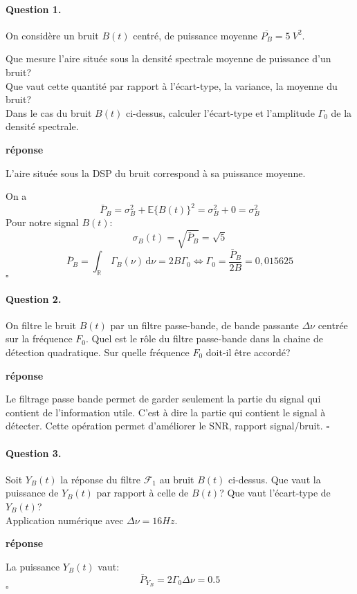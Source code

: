 \documentclass{article}
\newcommand{\dnu}{16}
\newcommand{\debutrep}[1]{\color{blue}\begin{center} \hrulefill \textbf{ #1 } \hrulefill \end{center} }
\newcommand{\finrep}{\vspace*{5mm}\hfill $\square$\color{black}\vspace*{5mm}}
\begin{document}
\paragraph{Question 1.}
On considère un bruit $B(t)$ centré, de puissance moyenne $\overline{P_B} = 5~V^2$.

Que mesure l'aire située sous la densité spectrale moyenne de puissance d'un bruit? \\
Que vaut cette quantité par rapport à l'écart-type, la variance, la moyenne du bruit? \\
Dans le cas du bruit $B(t)$ ci-dessus, calculer l'écart-type et l'amplitude $\Gamma_0$ de la densité spectrale.

\debutrep{réponse}
L’aire située sous la DSP du bruit correspond à sa puissance moyenne.

On a \[
\bar{P}_B = \sigma_B^2 + \mathbb{E}\{B(t)\}^2  = \sigma_B^2 + 0 = \sigma_B^2
\]
Pour notre signal $B(t)$:
$$
\sigma_B (t)=\sqrt{\bar{P}_B} = \sqrt{5}
$$
$$
\bar{P}_B=\int_\mathbb{R}\, \Gamma_B (\nu)\,\mathrm{d} \nu =  2B\Gamma_0 
\Longleftrightarrow \Gamma_0 = \frac{\bar{P}_B}{2B} = 0,015625
$$
\finrep

\paragraph{Question 2.} 
On filtre le bruit $B(t)$ par un filtre passe-bande, de bande passante  $\Delta\nu$ centrée sur  la fréquence  $F_0$. 
Quel est le rôle du filtre passe-bande dans la chaine de détection quadratique. Sur quelle fréquence $F_0$ doit-il être accordé?

\debutrep{réponse}
Le filtrage passe bande permet de garder seulement la partie du signal qui contient de l'information utile. C'est à dire la partie qui contient le signal à détecter. Cette opération permet d'améliorer le SNR, rapport signal/bruit.
\finrep

\paragraph{Question 3.} Soit $Y_B(t)$ la réponse du filtre $\mathcal{F}_1$ au bruit $B(t)$ ci-dessus. Que vaut la puissance de $Y_B(t)$ par rapport à celle de $B(t)$? Que vaut l'écart-type de $Y_B(t)$? \\
Application numérique avec $\Delta\nu = \dnu Hz$. \\

\debutrep{réponse}
La puissance $Y_B(t)$ vaut:
$$
\bar{P}_{Y_B} = 2 \Gamma_0 \Delta \nu  = 0.5
$$
\finrep
\end{document}
